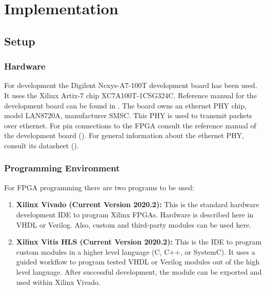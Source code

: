 \section{Implementation}

\subsection{Setup}
\subsubsection{Hardware}
For development the Digilent Nexys-A7-100T development board has been used. It uses the Xilinx Artix-7 chip XC7A100T-1CSG324C. Reference manual for the development board can be found in \cite{digilent:nexys-a7-ref-manual}.
The board owns an ethernet PHY chip, model LAN8720A, manufacturer SMSC. This PHY is used to transmit packets over ethernet. For pin connections to the FPGA consult the reference manual of the development board (\cite{digilent:nexys-a7-ref-manual}). For general information about the ethernet PHY, consult its datasheet (\cite{smsc:lan8720a}).

\subsubsection{Programming Environment}
For FPGA programming there are two programs to be used:
\begin{enumerate}
  \item \textbf{Xilinx Vivado (Current Version 2020.2):} This is the standard hardware development IDE to program Xilinx FPGAs. Hardware is described here in VHDL or Verilog. Also, custom and third-party modules can be used here.
  \item \textbf{Xilinx Vitis HLS (Current Version 2020.2):} This is the IDE to program custom modules in a higher level language (C, C++, or SystemC). It uses a guided workflow to program tested VHDL or Verilog modules out of the high level language. After successful development, the module can be exported and used within Xilinx Vivado.
\end{enumerate}

